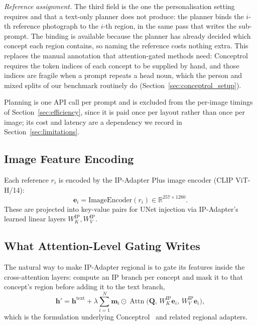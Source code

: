\documentclass[review,10pt,times]{elsarticle}
\begin{document}
\noindent\textit{Reference assignment.}
The third field is the one the personalisation setting requires and that a
text-only planner does not produce: the planner binds the $i$-th reference
photograph to the $i$-th region, in the same pass that writes the sub-prompt.
The binding is available because the planner has already decided which
concept each region contains, so naming the reference costs nothing extra.
This replaces the manual annotation that attention-gated methods need:
Conceptrol~\cite{he2025conceptrol} requires the token indices of each
concept to be supplied by hand, and those indices are fragile when a prompt
repeats a head noun, which the person and mixed splits of our benchmark
routinely do (Section~\ref{sec:conceptrol_setup}).

Planning is one API call per prompt and is excluded from the per-image
timings of Section~\ref{sec:efficiency}, since it is paid once per layout rather
than once per image; its cost and latency are a dependency we record in
Section~\ref{sec:limitations}.

\subsection{Image Feature Encoding}
\label{sec:encoding}

Each reference $r_i$ is encoded by the IP-Adapter Plus image encoder
(CLIP ViT-H/14):
\begin{equation}
  \mathbf{e}_i = \mathrm{ImageEncoder}(r_i)\in\mathbb{R}^{257\times 1280}.
\end{equation}
These are projected into key-value pairs for UNet injection via
IP-Adapter's learned linear layers $W_K^{\mathrm{IP}},
W_V^{\mathrm{IP}}$.

\subsection{What Attention-Level Gating Writes}
\label{sec:why_gating_fails}

The natural way to make IP-Adapter regional is to gate its features
inside the cross-attention layers: compute an IP branch per concept and
mask it to that concept's region before adding it to the text branch,
\begin{equation}
  \mathbf{h}' = \mathbf{h}^{\mathrm{text}}
    + \lambda \sum_{i=1}^{N}\mathbf{m}_i \odot
      \operatorname{Attn}\!\bigl(\mathbf{Q},\,W_K^{\mathrm{IP}}\mathbf{e}_i,\,
      W_V^{\mathrm{IP}}\mathbf{e}_i\bigr),
  \label{eq:gated}
\end{equation}
which is the formulation underlying
Conceptrol~\cite{he2025conceptrol} and related regional adapters.
\end{document}
